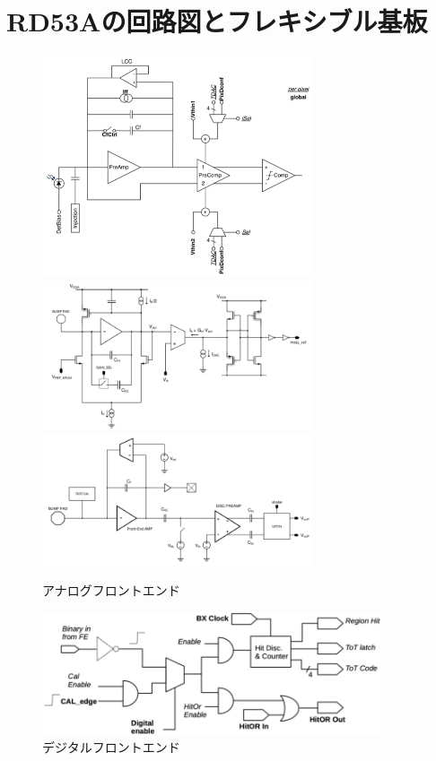 \chapter{RD53Aの回路図とフレキシブル基板} \label{chap:rd53a_circit}

\begin{figure}[bpt]
  \begin{center}
    \includegraphics[width=8cm]{diff_fe}
    \includegraphics[width=8cm]{lin_fe}
    \includegraphics[width=8cm]{syn_fe}
  \caption[アナログフロントエンド]{アナログフロントエンド\cite{2-1}}
  \label{analog_fe}
  \end{center}
\end{figure}

\begin{figure}[bpt]\centering
\includegraphics[width=10cm]{digital_fe}
\caption[デジタルフロントエンド]{デジタルフロントエンド\cite{2-1}}
\label{digital_fe}
\end{figure}

